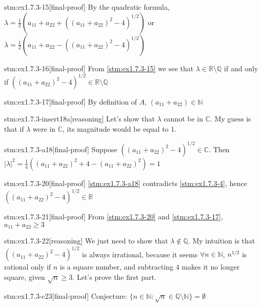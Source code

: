 \begin{stm}{stm:ex1.7.3-15}[final-proof]
By the quadratic formula, $\lambda = \frac{1}{2}(a_{11} + a_{22} + ((a_{11} + a_{22})^2 - 4)^{1/2})$ or $\lambda = \frac{1}{2}(a_{11} + a_{22} - ((a_{11} + a_{22})^2 - 4)^{1/2})$
\end{stm}

\begin{stm}{stm:ex1.7.3-16}[final-proof]
From \ref{stm:ex1.7.3-15} we see that $\lambda \in \mathbb{R} \setminus \mathbb{Q}$ if and only if $((a_{11} + a_{22})^2 - 4)^{1/2} \in \mathbb{R} \setminus \mathbb{Q}$
\end{stm}

\begin{stm}{stm:ex1.7.3-17}[final-proof]
By definition of $A$, $(a_{11} + a_{22}) \in \mathbb{N}$
\end{stm}

\begin{stm}{stm:ex1.7.3-insert18a}[reasoning]
Let's show that $\lambda$ cannot be in $\mathbb{C}$. My guess is that if $\lambda$ were in $\mathbb{C}$, its magnitude would be equal to $1$.
\end{stm}

\begin{stm}{stm:ex1.7.3-a18}[final-proof]
Suppose $((a_{11} + a_{22})^2 - 4)^{1/2} \in \mathbb{C}$. Then $|\lambda|^2 = \frac{1}{4}((a_{11} + a_{22})^2 + 4 - (a_{11} + a_{22})^2) = 1$
\end{stm}

\begin{stm}{stm:ex1.7.3-20}[final-proof]
\ref{stm:ex1.7.3-a18} contradicts \ref{stm:ex1.7.3-4}, hence $((a_{11} + a_{22})^2 - 4)^{1/2} \in \mathbb{R}$
\end{stm}

\begin{stm}{stm:ex1.7.3-21}[final-proof]
From \ref{stm:ex1.7.3-20} and \ref{stm:ex1.7.3-17}, $a_{11} + a_{22} \geq 3$
\end{stm}

\begin{stm}{stm:ex1.7.3-22}[reasoning]
We just need to show that $\lambda \notin \mathbb{Q}$. My intuition is that $((a_{11} + a_{22})^2 - 4)^{1/2}$ is always irrational, because it seems $\forall n \in \mathbb{N}$, $n^{1/2}$ is rational only if $n$ is a square number, and subtracting $4$ makes it no longer square, given $\sqrt{n} \ge 3$. Let's prove the first part.
\end{stm}

\begin{stm}{stm:ex1.7.3-c23}[final-proof]
Conjecture: $\{n \in \mathbb{N} : \sqrt{n} \in \mathbb{Q} \setminus \mathbb{N} \} = \emptyset$
\end{stm}

